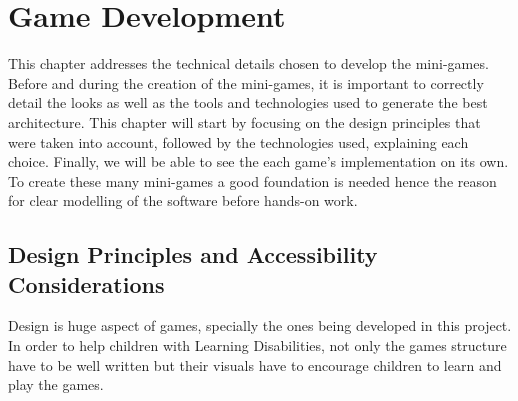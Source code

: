 \chapter{Game Development}
\label{cha:game_development}

This chapter addresses the technical details chosen to develop the mini-games. Before and during the creation of the mini-games, it is important to correctly detail the looks as well as the tools and technologies used to generate the best architecture.
This chapter will start by focusing on the design principles that were taken into account, followed by the technologies used, explaining each choice. Finally, we will be able to see the each game's implementation on its own.
To create these many mini-games a good foundation is needed hence the reason for clear modelling of the software before hands-on work.



	


\newpage
\section{Design Principles and Accessibility Considerations}

Design is huge aspect of games, specially the ones being developed in this project. In order to help children with Learning Disabilities, not only the games structure have to be well written but their visuals have to encourage children to learn and play the games.

